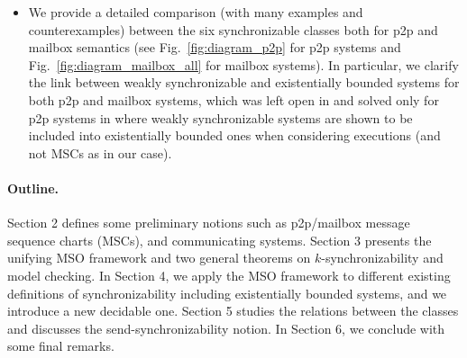 \documentclass[a4paper,UKenglish,cleveref, autoref, thm-restate]{lipics-v2021}
\begin{document}
\begin{itemize}

%


\item We provide a detailed comparison (with many examples and counterexamples) between the six synchronizable classes both for p2p and mailbox semantics (see Fig.~\ref{fig:diagram_p2p} for p2p systems and Fig.~\ref{fig:diagram_mailbox_all} for mailbox systems). In particular, we clarify the link between weakly synchronizable and existentially bounded systems for both p2p and mailbox systems, which was left open in \cite{DBLP:conf/cav/BouajjaniEJQ18} and  solved only for p2p systems in \cite[Theorem 7]{DBLP:journals/corr/abs-1901-09606} where  weakly synchronizable systems are shown to be included into existentially bounded ones when considering executions (and not MSCs as in our case).
\end{itemize}

\paragraph*{Outline.}
Section 2 defines some preliminary notions such as p2p/mailbox message sequence charts (MSCs), and communicating systems. Section 3 presents the unifying MSO framework and two general theorems on $k$-synchro\-nizability and model checking. In Section 4, we apply the MSO framework to different existing definitions of synchronizability including existentially bounded systems, and we introduce a new decidable one. Section 5 studies the relations between the classes and discusses the send-synchronizability notion. In Section 6, we conclude with some final remarks.

\end{document}
